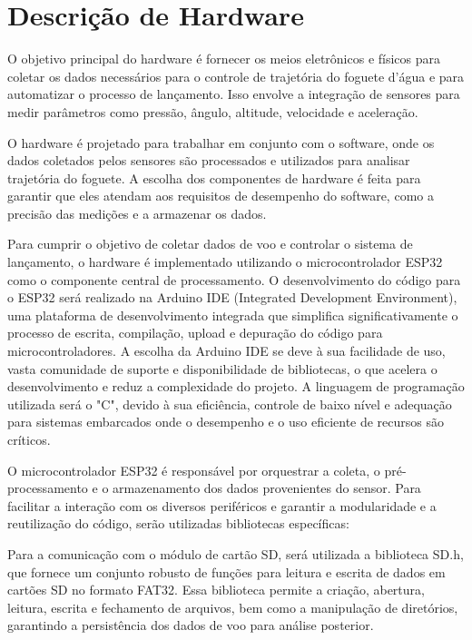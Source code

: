 \section{Descrição de Hardware}


O objetivo principal do hardware é fornecer os meios eletrônicos e físicos para coletar os dados necessários para o controle de trajetória do foguete d'água e para automatizar o processo de lançamento. Isso envolve a integração de sensores para medir parâmetros como pressão, ângulo, altitude, velocidade e aceleração.

O hardware é projetado para trabalhar em conjunto com o software, onde os dados coletados pelos sensores são processados e utilizados para analisar trajetória do foguete. A escolha dos componentes de hardware é feita para garantir que eles atendam aos requisitos de desempenho do software, como a precisão das medições e a armazenar os dados.


Para cumprir o objetivo de coletar dados de voo e controlar o sistema de lançamento, o hardware é implementado utilizando o microcontrolador ESP32 como o componente central de processamento. O desenvolvimento do código para o ESP32 será realizado na Arduino IDE (Integrated Development Environment), uma plataforma de desenvolvimento integrada que simplifica significativamente o processo de escrita, compilação, upload e depuração do código para microcontroladores. A escolha da Arduino IDE se deve à sua facilidade de uso, vasta comunidade de suporte e disponibilidade de bibliotecas, o que acelera o desenvolvimento e reduz a complexidade do projeto. A linguagem de programação utilizada será o "C", devido à sua eficiência, controle de baixo nível e adequação para sistemas embarcados onde o desempenho e o uso eficiente de recursos são críticos.

O microcontrolador ESP32 é responsável por orquestrar a coleta, o pré-processamento e o armazenamento dos dados provenientes do sensor. Para facilitar a interação com os diversos periféricos e garantir a modularidade e a reutilização do código, serão utilizadas bibliotecas específicas:

Para a comunicação com o módulo de cartão SD, será utilizada a biblioteca SD.h, que fornece um conjunto robusto de funções para leitura e escrita de dados em cartões SD no formato FAT32. Essa biblioteca permite a criação, abertura, leitura, escrita e fechamento de arquivos, bem como a manipulação de diretórios, garantindo a persistência dos dados de voo para análise posterior.

